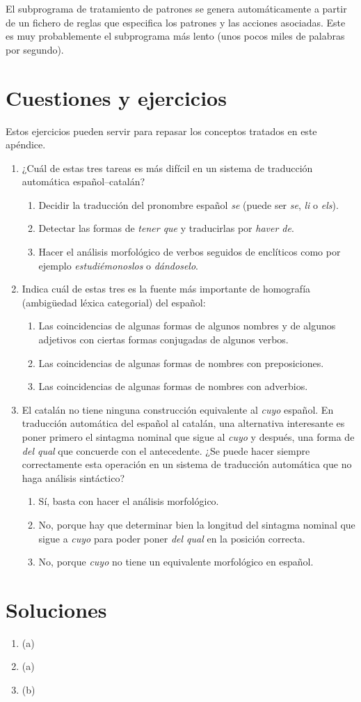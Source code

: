 El subprograma de tratamiento de patrones se genera automáticamente a partir de un fichero de reglas que especifica los patrones y las acciones asociadas. Este es muy probablemente el subprograma más lento (unos pocos miles de palabras por segundo). 

\section{Cuestiones y ejercicios} Estos ejercicios pueden servir para repasar los conceptos tratados en este apéndice. \begin{enumerate} \item¿Cuál de estas tres tareas es más difícil en un sistema de traducción automática español--catalán? \begin{enumerate} \item Decidir la traducción del pronombre español \emph{se} (puede ser \emph{se}, \emph{li} o \emph{els}). \item Detectar las formas de \emph{tener que} y traducirlas por \emph{haver de}. \item Hacer el análisis morfológico de verbos seguidos de enclíticos como por ejemplo \emph{estudiémonoslos} o \emph{dándoselo}. \end{enumerate} 

\item Indica cuál de estas tres es la fuente más importante de homografía (ambigüedad léxica categorial) del español: \begin{enumerate} \item Las coincidencias de algunas formas de algunos nombres y de algunos adjetivos con ciertas formas conjugadas de algunos verbos. \item Las coincidencias de algunas formas de nombres con preposiciones. \item Las coincidencias de algunas formas de nombres con adverbios. \end{enumerate} 

\item El catalán no tiene ninguna construcción equivalente al \emph{cuyo} español. En traducción automática del español al catalán, una alternativa interesante es poner primero el sintagma nominal que sigue al \emph{cuyo} y después, una forma de \emph{del qual} que concuerde con el antecedente. ¿Se puede hacer siempre correctamente esta operación en un sistema de traducción automática que no haga análisis sintáctico? \begin{enumerate} \item Sí, basta con hacer el análisis morfológico. \item No, porque hay que determinar bien la longitud del sintagma nominal que sigue a \emph{cuyo} para poder poner \emph{del qual} en la posición correcta. \item No, porque \emph{cuyo} no tiene un equivalente morfológico en español. \end{enumerate} 

\end{enumerate} 

\section{Soluciones} \begin{enumerate} \item (a) \item (a) \item (b) 

\end{enumerate} 
